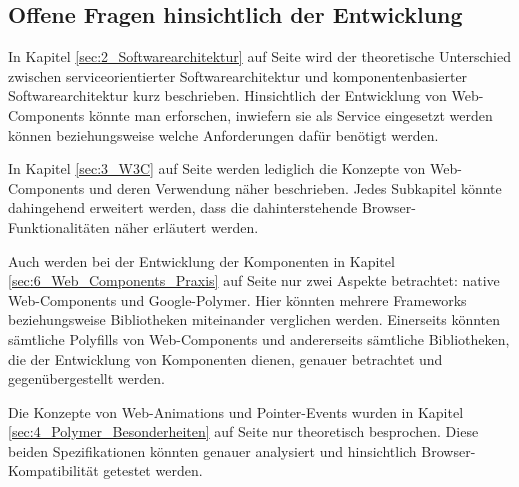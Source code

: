 \subsection{Offene Fragen hinsichtlich der Entwicklung}
\label{sec:5_Fragen}

In Kapitel \ref{sec:2_Softwarearchitektur} auf Seite \pageref{sec:2_Softwarearchitektur} wird der theoretische Unterschied zwischen serviceorientierter Softwarearchitektur und komponentenbasierter Softwarearchitektur kurz beschrieben. Hinsichtlich der Entwicklung von Web-Components könnte man erforschen, inwiefern sie als Service eingesetzt werden können beziehungsweise welche Anforderungen dafür benötigt werden.

In Kapitel \ref{sec:3_W3C} auf Seite \pageref{sec:3_W3C} werden lediglich die Konzepte von Web-Components und deren Verwendung näher beschrieben. Jedes Subkapitel könnte dahingehend erweitert werden, dass die dahinterstehende Browser-Funktionalitäten näher erläutert werden.

Auch werden bei der Entwicklung der Komponenten in Kapitel \ref{sec:6_Web_Components_Praxis} auf Seite \pageref{sec:6_Web_Components_Praxis} nur zwei Aspekte betrachtet: native Web-Components und Google-Polymer. Hier könnten mehrere Frameworks beziehungsweise Bibliotheken miteinander verglichen werden. Einerseits könnten sämtliche Polyfills von Web-Components und andererseits sämtliche Bibliotheken, die der Entwicklung von Komponenten dienen, genauer betrachtet und gegenübergestellt werden.

Die Konzepte von Web-Animations und Pointer-Events wurden in Kapitel \ref{sec:4_Polymer_Besonderheiten} auf Seite \pageref{sec:4_Polymer_Besonderheiten} nur theoretisch besprochen. Diese beiden Spezifikationen könnten genauer analysiert und hinsichtlich Browser-Kompatibilität getestet werden.